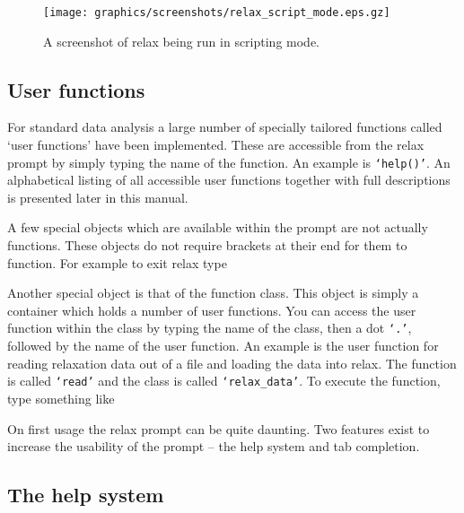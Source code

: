 \begin{figure}
\centerline{\texttt{[image: graphics/screenshots/relax\_script\_mode.eps.gz]}}
\caption[Scripting screenshot]{A screenshot of relax being run in scripting mode.}\label{fig: relax script}
\end{figure}



\subsection{User functions}

For standard data analysis a large number of specially tailored functions called `user functions' have been implemented.  These are accessible from the relax prompt by simply typing the name of the function.  An example is \texttt{`help()'}.  An alphabetical listing of all accessible user functions together with full descriptions is presented later in this manual.

A few special objects which are available within the prompt are not actually functions.  These objects do not require brackets at their end for them to function.  For example to exit relax type


Another special object is that of the function class.  This object is simply a container which holds a number of user functions.  You can access the user function within the class by typing the name of the class, then a dot \texttt{`.'}, followed by the name of the user function.  An example is the user function for reading relaxation data out of a file and loading the data into relax.  The function is called \texttt{`read'} and the class is called \texttt{`relax\_data'}.  To execute the function, type something like


On first usage the relax prompt can be quite daunting.  Two features exist to increase the usability of the prompt -- the help system and tab completion.




\subsection{The help system}

